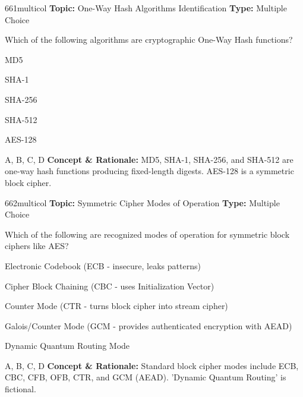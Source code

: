 \begin{qcard}{661}{multicol}
\textcolor{darkslate!75}{\small\textbf{Topic:} One-Way Hash Algorithms Identification \hfill \textbf{Type:} Multiple Choice}\vspace{0.4em}\par
Which of the following algorithms are cryptographic One-Way Hash functions?
\begin{qoptions}
\item MD5
\item SHA-1
\item SHA-256
\item SHA-512
\item AES-128
\end{qoptions}
\end{qcard}
\nopagebreak
\begin{explainbox}{A, B, C, D}
\textbf{Concept \& Rationale:} MD5, SHA-1, SHA-256, and SHA-512 are one-way hash functions producing fixed-length digests. AES-128 is a symmetric block cipher.
\end{explainbox}

\begin{qcard}{662}{multicol}
\textcolor{darkslate!75}{\small\textbf{Topic:} Symmetric Cipher Modes of Operation \hfill \textbf{Type:} Multiple Choice}\vspace{0.4em}\par
Which of the following are recognized modes of operation for symmetric block ciphers like AES?
\begin{qoptions}
\item Electronic Codebook (ECB - insecure, leaks patterns)
\item Cipher Block Chaining (CBC - uses Initialization Vector)
\item Counter Mode (CTR - turns block cipher into stream cipher)
\item Galois/Counter Mode (GCM - provides authenticated encryption with AEAD)
\item Dynamic Quantum Routing Mode
\end{qoptions}
\end{qcard}
\nopagebreak
\begin{explainbox}{A, B, C, D}
\textbf{Concept \& Rationale:} Standard block cipher modes include ECB, CBC, CFB, OFB, CTR, and GCM (AEAD). 'Dynamic Quantum Routing' is fictional.
\end{explainbox}

